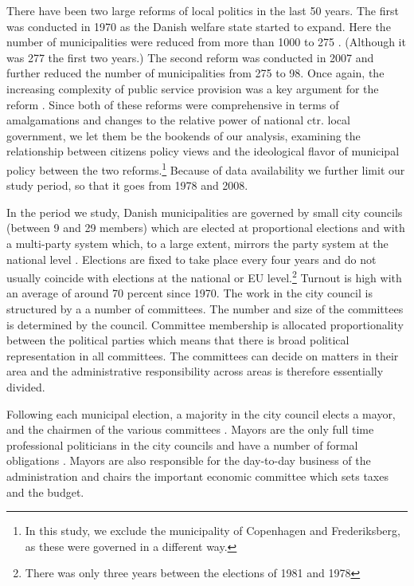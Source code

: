 \documentclass[a4paper,12pt]{article}
\begin{document}
There have been two large reforms of local politics in the last 50 years. The first was conducted in 1970 as the Danish welfare state started to expand. Here the number of municipalities were reduced from more than 1000 to 275 \citep{ingvartsen1991kommunalreformen}. (Although it was 277 the first two years.)  The second reform was conducted in 2007 and further reduced the number of municipalities from 275 to 98. Once again, the increasing complexity of public service provision was a key argument for the reform \citep{christiansen2008utaenkelige}. Since both of these reforms were comprehensive in terms of amalgamations and changes to the relative power of national ctr. local government, we let them be the bookends of our analysis, examining the relationship between citizens policy views and the ideological flavor of municipal policy between the two reforms.\footnote{In this study, we exclude the municipality of Copenhagen and Frederiksberg, as these were governed in a different way.} Because of data availability we further limit our study period, so that it goes from 1978 and 2008.


In the period we study, Danish municipalities are governed by small city councils (between 9 and 29 members) which are elected at proportional elections and with a multi-party system which, to a large extent, mirrors the party system at the national level \citep{blom2013et}. Elections are fixed to take place every four years and do not usually coincide with elections at the national or EU level.\footnote{There was only three years between the elections of 1981 and 1978} Turnout is high with an average of around 70 percent since 1970.  The work in the city council is structured by a a number of committees. The number and size of the committees is determined by the council. Committee membership is allocated proportionality between the political parties which means that there is broad political representation in all committees. The committees can decide on matters in their area and the administrative responsibility across areas is therefore essentially divided. 

Following each municipal election, a majority in the city council elects a mayor, and the chairmen of the various committees \citep{serritzlew2008explaining}. Mayors are the only full time professional politicians in the city councils and have a number of formal obligations \citep{kjaer2015urban}. Mayors are also responsible for the day-to-day business of the administration and chairs the important economic committee which sets taxes and the budget.
\end{document}
